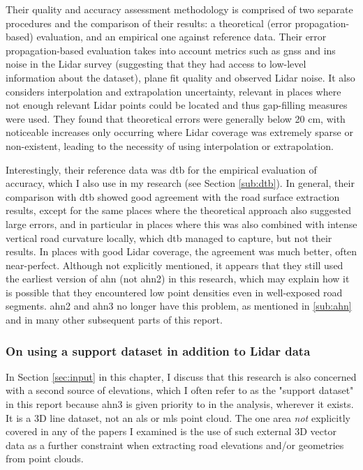 Their quality and accuracy assessment methodology is comprised of two separate procedures and the comparison of their results: a theoretical (error propagation-based) evaluation, and an empirical one against reference data. Their error propagation-based evaluation takes into account metrics such as \ac{gnss} and \ac{ins} noise in the Lidar survey (suggesting that they had access to low-level information about the dataset), plane fit quality and observed Lidar noise. It also considers interpolation and extrapolation uncertainty, relevant in places where not enough relevant Lidar points could be located and thus gap-filling measures were used. They found that theoretical errors were generally below 20 cm, with noticeable increases only occurring where Lidar coverage was extremely sparse or non-existent, leading to the necessity of using interpolation or extrapolation.

Interestingly, their reference data was \ac{dtb} for the empirical evaluation of accuracy, which I also use in my research (see Section \ref{sub:dtb}). In general, their comparison with \ac{dtb} showed good agreement with the road surface extraction results, except for the same places where the theoretical approach also suggested large errors, and in particular in places where this was also combined with intense vertical road curvature locally, which \ac{dtb} managed to capture, but not their results. In places with good Lidar coverage, the agreement was much better, often near-perfect. Although not explicitly mentioned, it appears that they still used the earliest version of \ac{ahn} (not \ac{ahn2}) in this research, which may explain how it is possible that they encountered low point densities even in well-exposed road segments. \ac{ahn2} and \ac{ahn3} no longer have this problem, as mentioned in \ref{sub:ahn} and in many other subsequent parts of this report.

\subsubsection{On using a support dataset in addition to Lidar data}

In Section \ref{sec:input} in this chapter, I discuss that this research is also concerned with a second source of elevations, which I often refer to as the "support dataset" in this report because \ac{ahn3} is given priority to in the analysis, wherever it exists. It is a 3D line dataset, not an \ac{als} or \ac{mls} point cloud. The one area \textit{not} explicitly covered in any of the papers I examined is the use of such external 3D vector data as a further constraint when extracting road elevations and/or geometries from point clouds.

